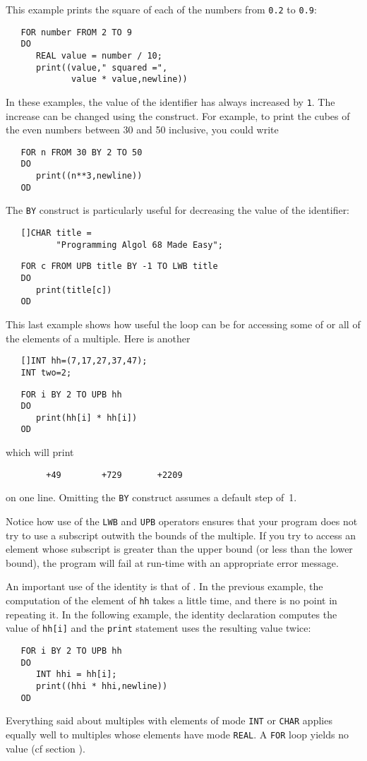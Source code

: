 This example prints the square of each of the numbers from \verb|0.2|
to \verb|0.9|:
\begin{verbatim}
   FOR number FROM 2 TO 9
   DO
      REAL value = number / 10;
      print((value," squared =",
             value * value,newline))
\end{verbatim}
\noindent
In these examples, the value of the identifier has always increased
by \verb|1|. The increase can be changed using the 
construct. For example, to print the cubes of the even numbers
between 30 and 50 inclusive, you could write
\begin{verbatim}
   FOR n FROM 30 BY 2 TO 50
   DO
      print((n**3,newline))
   OD
\end{verbatim}
\noindent
The \verb|BY| construct is particularly useful for decreasing the
value of the identifier:
\begin{verbatim}
   []CHAR title =
          "Programming Algol 68 Made Easy";
\end{verbatim}
\begin{verbatim}
   FOR c FROM UPB title BY -1 TO LWB title
   DO
      print(title[c])
   OD
\end{verbatim}
\noindent
This last example shows how useful the loop
 can be for accessing some of or all of
the elements of a multiple.  Here is another
\begin{verbatim}
   []INT hh=(7,17,27,37,47);
   INT two=2;
\end{verbatim}
\begin{verbatim}
   FOR i BY 2 TO UPB hh
   DO
      print(hh[i] * hh[i])
   OD
\end{verbatim}
\noindent
which will print
\begin{verbatim}
        +49        +729       +2209
\end{verbatim}
\noindent
on one line.  Omitting the \verb|BY| construct assumes a default step
of~1.

Notice how use of the \verb|LWB| and \verb|UPB| operators ensures
that your program does not try to use a subscript outwith the bounds
of the multiple. If you try to access an element whose subscript is
greater than the upper bound (or less than the lower bound), the
program will fail at run-time with an appropriate error message.

An important use of the identity
 is that of
. In the previous example, the computation of the
 element of \verb|hh| takes a little time,
and there is no point in repeating it.  In the following example, the
identity declaration computes the value of \verb|hh[i]| and the
\verb|print| statement uses the resulting value twice:
\begin{verbatim}
   FOR i BY 2 TO UPB hh
   DO
      INT hhi = hh[i];
      print((hhi * hhi,newline))
   OD
\end{verbatim}
\noindent
Everything said about multiples with elements of mode \verb|INT| or
\verb|CHAR| applies equally well to multiples whose elements have
mode \verb|REAL|. A \verb|FOR| loop yields no value (cf section
).


